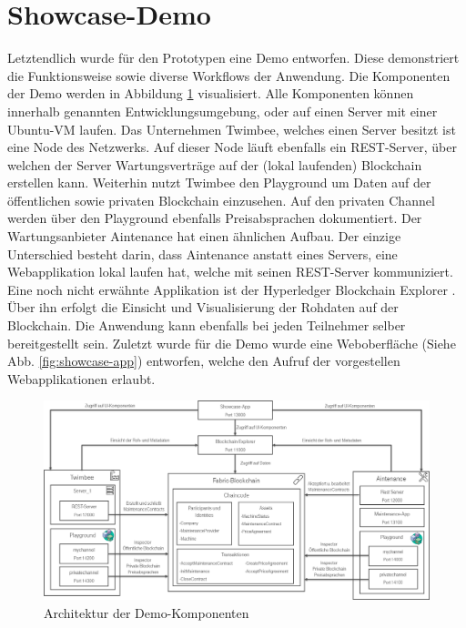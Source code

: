 \section{Showcase-Demo}
Letztendlich wurde für den Prototypen eine Demo entworfen. Diese demonstriert die Funktionsweise sowie diverse Workflows der Anwendung. Die Komponenten der Demo werden in Abbildung \ref{fig:architecture-showcase} visualisiert. Alle Komponenten können innerhalb genannten Entwicklungsumgebung, oder auf einen Server mit einer Ubuntu-VM laufen. Das Unternehmen Twimbee, welches einen Server besitzt ist eine Node des Netzwerks. Auf dieser Node läuft ebenfalls ein REST-Server, über welchen der Server Wartungsverträge auf der (lokal laufenden) Blockchain erstellen kann. Weiterhin nutzt Twimbee den Playground um Daten auf der öffentlichen sowie privaten Blockchain einzusehen. Auf den privaten Channel werden über den Playground ebenfalls Preisabsprachen dokumentiert. Der Wartungsanbieter Aintenance hat einen ähnlichen Aufbau. Der einzige Unterschied besteht darin, dass Aintenance anstatt eines Servers, eine Webapplikation lokal laufen hat, welche mit seinen REST-Server kommuniziert. Eine noch nicht erwähnte Applikation ist der Hyperledger Blockchain Explorer \cite{HyperledgerBlockchainExplorer2018}. Über ihn erfolgt die Einsicht und Visualisierung der Rohdaten auf der Blockchain. Die Anwendung kann ebenfalls bei jeden Teilnehmer selber bereitgestellt sein. Zuletzt wurde für die Demo wurde eine Weboberfläche (Siehe Abb. \ref{fig:showcase-app}) entworfen, welche den Aufruf der vorgestellen Webapplikationen erlaubt.

\begin{figure}[htb]
    \centering
      \includegraphics[width=1.0\textwidth,angle=0]{images/architecture_showcase}
       \caption{Architektur der Demo-Komponenten}
      \label{fig:architecture-showcase}
\end{figure}

